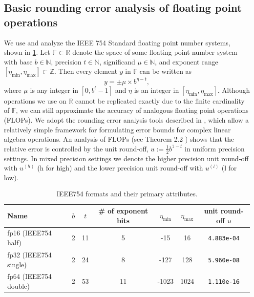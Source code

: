 \documentclass[review,onefignum,onetabnum]{siamart190516}
\newcommand{\R}{\mathbb{R}}
\newcommand{\F}{\mathbb{F}}
\begin{document}
\subsection{Basic rounding error analysis of floating point operations}\label{sec:backgroundRE}
We use and analyze the IEEE 754 Standard floating point number systems, shown in \cref{table:ieee}.
Let $\F \subset \R$ denote the space of some floating point number system with base $b\in\mathbb{N}$, precision $t\in\mathbb{N}$, significand $\mu\in\mathbb{N}$, and exponent range $[\eta_{\text{min}}, \eta_{\text{max}}]\subset \mathbb{Z}$.
Then every element $y$ in $\F$ can be written as 
\begin{equation}
y = \pm \mu\times b^{\eta-t},
\label{eqn:FPbasic}
\end{equation} 
where $\mu$ is any integer in $[0,b^{t}-1]$ and $\eta$ is an integer in  $[\eta_{\text{min}}, \eta_{\text{max}}]$.
Although operations we use on $\R$ cannot be replicated exactly due to the finite cardinality of $\F$, we can still approximate the accuracy of analogous floating point operations (FLOPs).
We adopt the rounding error analysis tools described in \cite{Higham2002}, which allow a relatively simple framework for formulating error bounds for complex linear algebra operations. 
An analysis of FLOPs (see Theorem 2.2 \cite{Higham2002}) shows that the relative error is 
controlled by the unit round-off, $u:=\frac{1}{2}b^{1-t}$ in uniform precision settings. 
In mixed precision settings we denote the higher precision unit round-off with $u^{(h)}$ (h for high) and the lower precision unit round-off with $u^{(l)}$ (l for low).\par 
\vspace{-.3cm}
\begin{table}[H]
	\begin{tabular}{||l|c|c|c|c|c|c||} 
		\hline 
		Name & $b$ & $t$ & \# of exponent bits & $\eta_{\text{min}}$ & $\eta_{\text{max}}$ & unit round-off $u$ \\ \hline 
		fp16 (IEEE754 half)& 2 & 11 & 5 & -15 & 16  & {\tt 4.883e-04} \\ \hline 
		fp32 (IEEE754 single)& 2 & 24 & 8 & -127 & 128  & {\tt 5.960e-08} \\ \hline 
		fp64 (IEEE754 double)& 2 & 53 & 11 & -1023 & 1024 & {\tt 1.110e-16} \\ \hline 
	\end{tabular}
	\caption{IEEE754 formats and their primary attributes.} 
	\label{table:ieee}
\end{table}
\vspace{-.8cm}
\end{document}

